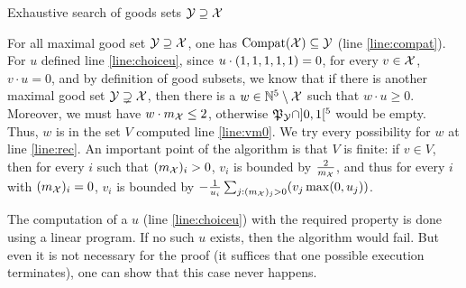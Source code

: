 \documentclass[11pt]{article}
\theoremstyle{definition}
\begin{document}
\begin{algorithm}
  \caption{Exhaustive search of goods sets $\mathcal{Y}\supseteq \mathcal{X}$}
  \label{algo:rec}
  \begin{algorithmic}[1]
\Procedure{\namerecproc}{$\mX$}
\State{$\mX \gets \compat(\mX)$}\label{line:compat}
\IIf{$\polydec_\mX \cap ]0,1[^5 = \emptyset$}\label{line:empty} \Return \EndIIf
{}
\EndIf
{}
%
%
 \State {} \label{line:rec} \EndFor
%
%
%
%
%
%
%
%
%
\EndProcedure
\end{algorithmic}
\end{algorithm}

For all maximal good set $\mathcal{Y}\supseteq \mathcal{X}$, one has $\operatorname{Compat}(\mathcal{X})\subseteq \mathcal{Y}$ (line \ref{line:compat}).
For $u$ defined line \ref{line:choiceu}, since $u\cdot \v1 =0$, for every $v\in\mathcal{X}$, $v\cdot u=0$, and by definition of good subsets, we know that
if there is another maximal good set $\mathcal{Y} \supsetneq \mathcal{X}$, then there is a $w\in \mathbb{N}^5\setminus \mathcal{X}$ such that $w\cdot u\ge 0$. Moreover, we must have $w\cdot m_{\mathcal{X}} \le 2$, otherwise $\mathfrak{P}_{\mathcal{Y}}\cap ]0,1[^5$ would be empty. Thus, $w$ is in the set $V$ computed line \ref{line:vm0}. We try every possibility for $w$ at line \ref{line:rec}.
An important point of the algorithm is that $V$ is finite: if $v\in V$, then for every $i$ such that $(m_{\mathcal{X}})_i>0$, $v_i$ is bounded by $\frac{2}{m_{\mathcal{X}}}$, and thus for every $i$ with $(m_{\mathcal{X}})_i=0$, $v_i$ is bounded by $-\frac{1}{u_i} \sum_{j:(m_{\mathcal{X}})_j>0} (v_j\max(0,u_j))$.

The computation of a $u$ (line \ref{line:choiceu}) with the required property is done using a linear program. 
If no such $u$ exists, then the algorithm would fail. But even it is not necessary for the proof (it suffices that one possible execution terminates), one can show that this case never happens.
\end{document}
